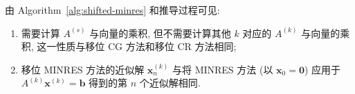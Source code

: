 {由 Algorithm\ \ref{alg:shifted-minres} 和推导过程可见:}
\begin{enumerate}
\item {需要计算 $A^{(s)}$ 与向量的乘积, 但不需要计算其他 $k$ 对应的 $A^{(k)}$ 与向量的乘积, 这一性质与移位 CG 方法和移位 CR 方法相同;}
\item {移位 MINRES 方法的近似解 $\bm x_n^{(k)}$ 与将 MINRES 方法 (以 $\bm x_0=\bm0$) 应用于 $A^{(k)}\bm x^{(k)}=\bm b$ 得到的第 $n$ 个近似解相同.}
\end{enumerate}
